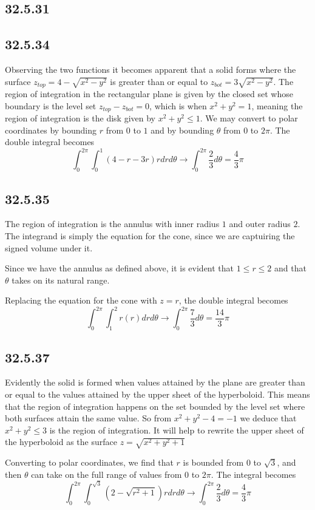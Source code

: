 \documentclass{article}
\begin{document}
\subsection{32.5.31}

\subsection{32.5.34}

Observing the two functions it becomes apparent that a solid forms where the surface $z_{top} = 4-\sqrt{x^2-y^2}$ is greater than or equal to $z_{bot} = 3\sqrt{x^2-y^2}$. The region of integration in the rectangular plane is given by the closed set whose boundary is the level set $z_{top} - z_{bot} = 0$, which is when $x^2+y^2 = 1$, meaning the region of integration is the disk given by $x^2+y^2 \leq 1$. We may convert to polar coordinates by bounding $r$ from $0$ to $1$ and by bounding $\theta$ from $0$ to $2\pi$. The double integral becomes $$\int_{0}^{2\pi}\int_{0}^{1} \left(4-r-3r\right)rdrd\theta \to \int_{0}^{2\pi}\frac{2}{3}d\theta = \frac{4}{3}\pi$$

\subsection{32.5.35}

The region of integration is the annulus with inner radius $1$ and outer radius $2$. The integrand is simply the equation for the cone, since we are captuiring the signed volume under it.

Since we have the annulus as defined above, it is evident that $1\leq r \leq 2$ and that $\theta$ takes on its natural range.

Replacing the equation for the cone with $z=r$, the double integral becomes $$\int_0^{2\pi}\int_1^2 r (r)drd\theta \to \int_0^{2\pi} \frac{7}{3}d\theta= \frac{14}{3}\pi$$

\subsection{32.5.37}

Evidently the solid is formed when values attained by the plane are greater than or equal to the values attained by the upper sheet of the hyperboloid. This means that the region of integration happens on the set bounded by the level set where both surfaces attain the same value. So from $x^2+y^2 - 4 = -1$ we deduce that $x^2 + y^2 \leq 3$ is the region of integration. It will help to rewrite the upper sheet of the hyperboloid as the surface $z = \sqrt{x^2+y^2+1}$

Converting to polar coordinates, we find that $r$ is bounded from $0$ to $\sqrt{3}$, and then $\theta$ can take on the full range of values from $0$ to $2\pi$. The integral becomes $$\int_{0}^{2\pi}\int_{0}^{\sqrt{3}} \left(2-\sqrt{r^2+1}\right)rdrd\theta \to \int_{0}^{2\pi} \frac{2}{3}d\theta = \frac{4}{3}\pi$$
\end{document}
